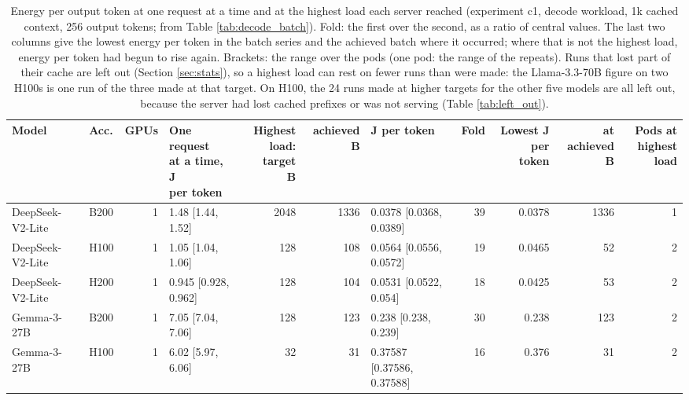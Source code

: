 \begin{landscape}
\begin{table}[t]
\centering
\scriptsize
\setlength{\tabcolsep}{3pt}
\caption{Energy per output token at one request at a time and at the highest load each server reached (experiment c1, decode workload, 1k cached context, 256 output tokens; from Table \ref{tab:decode_batch}). Fold: the first over the second, as a ratio of central values. The last two columns give the lowest energy per token in the batch series and the achieved batch where it occurred; where that is not the highest load, energy per token had begun to rise again. Brackets: the range over the pods (one pod: the range of the repeats). Runs that lost part of their cache are left out (Section \ref{sec:stats}), so a highest load can rest on fewer runs than were made: the Llama-3.3-70B figure on two H100s is one run of the three made at that target. On H100, the 24 runs made at higher targets for the other five models are all left out, because the server had lost cached prefixes or was not serving (Table \ref{tab:left_out}).}\label{tab:batch_summary}
\begin{tabular}{llrlrrlrrrr}
\toprule
Model & Acc. & GPUs & \makecell[l]{One request\\at a time, J\\per token} & \makecell[r]{Highest\\load: target\\B} & achieved B & J per token & Fold & \makecell[r]{Lowest J per\\token} & \makecell[r]{at achieved\\B} & \makecell[r]{Pods at\\highest load} \\
\midrule
DeepSeek-V2-Lite & B200 & 1 & 1.48 {[}1.44, 1.52{]} & 2048 & 1336 & 0.0378 {[}0.0368, 0.0389{]} & 39 & 0.0378 & 1336 & 1 \\
DeepSeek-V2-Lite & H100 & 1 & 1.05 {[}1.04, 1.06{]} & 128 & 108 & 0.0564 {[}0.0556, 0.0572{]} & 19 & 0.0465 & 52 & 2 \\
DeepSeek-V2-Lite & H200 & 1 & 0.945 {[}0.928, 0.962{]} & 128 & 104 & 0.0531 {[}0.0522, 0.054{]} & 18 & 0.0425 & 53 & 2 \\
Gemma-3-27B & B200 & 1 & 7.05 {[}7.04, 7.06{]} & 128 & 123 & 0.238 {[}0.238, 0.239{]} & 30 & 0.238 & 123 & 2 \\
Gemma-3-27B & H100 & 1 & 6.02 {[}5.97, 6.06{]} & 32 & 31 & 0.37587 {[}0.37586, 0.37588{]} & 16 & 0.376 & 31 & 2 \\

\end{tabular}
\end{table}
\end{landscape}
